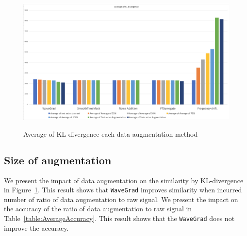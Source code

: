 \begin{figure}[ht!]
    \centering
    \caption[Average of KL divergence]{Average of KL divergence each data augmentation method}
    \includegraphics[width=1\textwidth]{../fig/Avg_KL.png}
    \label{fig:KL-average}
  \end{figure}

\subsection{Size of augmentation}
We present the impact of data augmentation on the similarity by KL-divergence in Figure~\ref{fig:KL-average}.
This result shows that \texttt{WaveGrad} improves similarity when incurred number of ratio of data augmentation to raw signal.
We present the impact on the accuracy of the ratio of data augmentation to raw signal in Table~\ref{table:AverageAccuracy}.
This result shows that the \texttt{WaveGrad} does not improve the accuracy.

